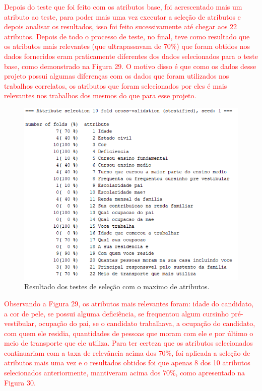 \par
\textcolor{red}{Depois do teste que foi feito com os atributos base, foi acrescentado mais um atributo ao teste, para poder mais uma vez executar a seleção de atributos e depois analisar os resultados, isso foi feito sucessivamente até chegar aos 22 atributos. Depois de todo o processo de teste, no final, teve como resultado que os atributos mais relevantes (que ultrapassavam de 70\%) que foram obtidos nos dados fornecidos eram praticamente diferentes dos dados selecionados para o teste base, como demonstrado na Figura 29. O motivo disso é que  como os dados desse projeto possui algumas diferenças com os dados que foram utilizados nos trabalhos correlatos, os atributos que foram selecionados por eles é mais relevantes nos trabalhos dos mesmos do que para esse projeto.}

\par
\begin{figure}[!htp]
	\begin{center}
    \caption{\label{fig:waveform_fig} Resultado dos testes de seleção com o maximo de atributos.}
	\includegraphics[scale=0.90]{Figuras/22_atributos.png}
	\end{center}
\end{figure}

\par
\textcolor{red}{}

\par
\textcolor{red}{}

\par
\textcolor{red}{Observando a Figura 29,  os atributos mais relevantes foram: idade do candidato, a cor de pele, se possui alguma deficiência, se frequentou algum cursinho pré-vestibular, ocupação do pai, se o candidato trabalhava, a ocupação do candidato, com quem ele residia, quantidades de pessoas que moram com ele e por último o meio de transporte que ele utiliza. Para ter certeza que os atributos selecionados continuariam com a taxa de relevância acima dos 70\%, foi aplicada a seleção de atributos mais uma vez e o resultados obtidos foi que apenas 8 dos 10 atributos selecionados anteriormente, mantiveram acima dos 70\%, como apresentado na Figura 30.}

